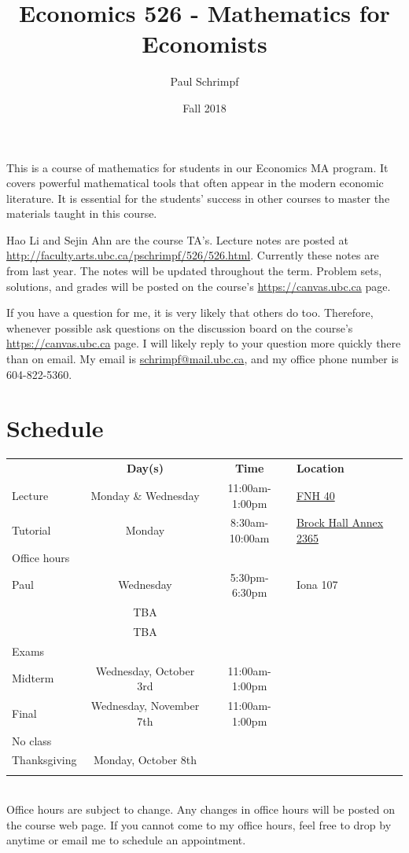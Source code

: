 \documentclass[10pt]{article}
\title{Economics 526 - Mathematics for Economists}
\date{Fall 2018}
\author{Paul Schrimpf}
\begin{document}
\maketitle

This is a course of mathematics for students in our Economics MA
program. It covers powerful mathematical tools that often appear
in the modern economic literature. It is essential for the students'
success in other courses to master the materials taught in this
course.

Hao Li and Sejin Ahn are the course TA's.  Lecture notes are posted
at \url{http://faculty.arts.ubc.ca/pschrimpf/526/526.html}. Currently
these notes are from last year. The notes will be updated throughout
the term. Problem sets, solutions, and grades will be posted on the
course's \url{https://canvas.ubc.ca} page.

If you have a question for me, it is very likely that others do
too. Therefore, whenever possible ask questions on the discussion
board on the course's \url{https://canvas.ubc.ca} page.  I will likely
reply to your question more quickly there than on email. My email is
\href{mailto:schrimp@mail.ubc.ca}{schrimpf@mail.ubc.ca}, and my office
phone number is 604-822-5360.

\section{Schedule}
\begin{tabular}{l c c l}
  \hline 
  & \textbf{Day(s)} & \textbf{Time} & \textbf{Location} \\
  Lecture & Monday \& Wednesday & 11:00am-1:00pm &
                                                   \href{https://ssc.adm.ubc.ca/classroomservices/function/viewlocation?userEvent=ShowLocation&buildingID=FNH&roomID=40}{FNH 40} \\
  Tutorial & Monday & 8:30am-10:00am &
  \href{https://ssc.adm.ubc.ca/classroomservices/function/viewlocation?userEvent=ShowLocation&buildingID=BRKX&roomID=2365}
  {Brock Hall Annex 2365}  \\
  Office hours \\
  \; Paul & Wednesday & 5:30pm-6:30pm & Iona 107 \\
  \;  & TBA & & \\ 
  \;  & TBA & & \\ \hline
  Exams \\
  \; Midterm & Wednesday, October 3rd & 11:00am-1:00pm &
                                                         \\
  \; Final & Wednesday, November 7th & 11:00am-1:00pm &
                                                         \\
  No class \\
  \; Thanksgiving & Monday, October 8th \\
  \\ \hline 
\end{tabular} \\
Office hours are subject to change. Any changes in office hours will
be posted on the course web page. If you cannot come to my office
hours, feel free to drop by anytime or email me to schedule an
appointment.  
\end{document}
